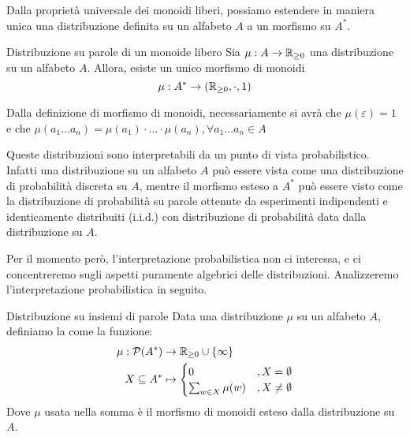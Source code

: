 Dalla proprietà universale dei monoidi liberi, possiamo estendere in maniera unica una distribuzione definita su un alfabeto \(A\) a un morfismo su \(A^*\).
\begin{definition}{Distribuzione su parole di un monoide libero}
  Sia \(\mu: A \to \mathbb{R}_{\geq 0}\) una distribuzione su un alfabeto \(A\).
  Allora, esiste un unico morfismo di monoidi
    \[\mu: A^* \to (\mathbb{R}_{\geq 0}, \cdot, 1)\]
\end{definition}

Dalla definizione di morfismo di monoidi, necessariamente si avrà che \(\mu(\varepsilon) = 1\) e che \(\mu(a_1\ldots a_n) = \mu(a_1)\cdot\ldots\cdot \mu(a_n), \forall a_1\ldots a_n \in A\)

\begin{note}{}
  Queste distribuzioni sono interpretabili da un punto di vista probabilistico.
  Infatti una distribuzione su un alfabeto \(A\) può essere vista come una distribuzione di probabilità discreta su \(A\),
  mentre il morfismo esteso a \(A^*\) può essere visto come la distribuzione di probabilità su parole ottenute da esperimenti indipendenti e identicamente distribuiti (i.i.d.) con distribuzione di probabilità data dalla distribuzione su \(A\).
  
  Per il momento però, l'interpretazione probabilistica non ci interessa, e ci concentreremo sugli aspetti puramente algebrici delle distribuzioni.
  Analizzeremo l'interpretazione probabilistica in seguito.
\end{note}

\begin{definition}{Distribuzione su insiemi di parole}
  Data una distribuzione \(\mu\) su un alfabeto \(A\), definiamo la  come la funzione:
  \begin{equation*}
    \begin{aligned}
      \mu: \mathcal{P}(A^*) &\to \R_{\geq 0} \cup \set{\infty} \\
                  X \subseteq A^* &\mapsto \begin{cases}
                      0 & ,X = \emptyset \\
                      \sum_{w \in X} \mu(w) & ,X \neq \emptyset
                    \end{cases}
    \end{aligned}
  \end{equation*}
  Dove \(\mu\) usata nella somma è il morfismo di monoidi esteso dalla distribuzione su \(A\).  
\end{definition}

